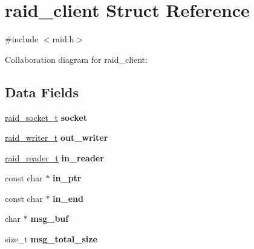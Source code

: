 \hypertarget{structraid__client}{}\section{raid\+\_\+client Struct Reference}
\label{structraid__client}


{\ttfamily \#include $<$raid.\+h$>$}



Collaboration diagram for raid\+\_\+client\+:
\subsection*{Data Fields}
\begin{DoxyCompactItemize}
\item 
\hyperlink{structraid__socket}{raid\+\_\+socket\+\_\+t} {\bfseries socket}\hypertarget{structraid__client_add578140e41c5fedcd27aa7a22e7fdab}{}\label{structraid__client_add578140e41c5fedcd27aa7a22e7fdab}

\item 
\hyperlink{structraid__writer}{raid\+\_\+writer\+\_\+t} {\bfseries out\+\_\+writer}\hypertarget{structraid__client_a88a43cfd1ffc34d1066819d8db7ed998}{}\label{structraid__client_a88a43cfd1ffc34d1066819d8db7ed998}

\item 
\hyperlink{structraid__reader}{raid\+\_\+reader\+\_\+t} {\bfseries in\+\_\+reader}\hypertarget{structraid__client_a98c46826b00cce33e56aff38fa450950}{}\label{structraid__client_a98c46826b00cce33e56aff38fa450950}

\item 
const char $\ast$ {\bfseries in\+\_\+ptr}\hypertarget{structraid__client_a4bc38eae2bc75852a191e7807339c8e2}{}\label{structraid__client_a4bc38eae2bc75852a191e7807339c8e2}

\item 
const char $\ast$ {\bfseries in\+\_\+end}\hypertarget{structraid__client_a6616be57c951a7924ff259d8243cb363}{}\label{structraid__client_a6616be57c951a7924ff259d8243cb363}

\item 
char $\ast$ {\bfseries msg\+\_\+buf}\hypertarget{structraid__client_a4462a275733743757775cb3b658819c0}{}\label{structraid__client_a4462a275733743757775cb3b658819c0}

\item 
size\+\_\+t {\bfseries msg\+\_\+total\+\_\+size}\hypertarget{structraid__client_a0fe8184e8f6deb317e50a94833618597}{}\label{structraid__client_a0fe8184e8f6deb317e50a94833618597}


\end{DoxyCompactItemize}
